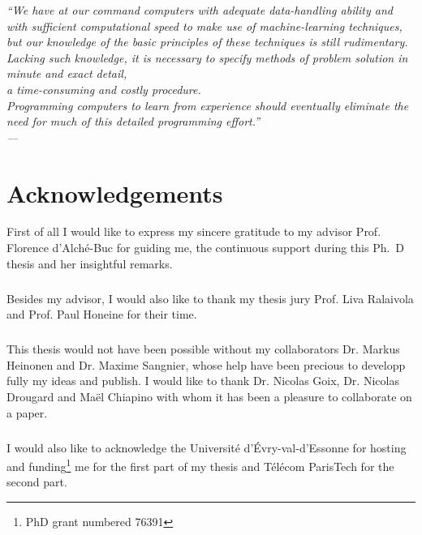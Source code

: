 

\begin{flushright}{\slshape
    ``We have at our command computers with adequate data-handling ability and
    with sufficient computational speed to make use of machine-learning
    techniques, \\
    but our knowledge of the basic principles of these techniques is still
    rudimentary. \\
    Lacking such knowledge, it is necessary to specify methods of
    problem solution in minute and exact detail, \\
    a time-consuming and costly procedure. \\
    Programming computers to learn from experience should eventually
    eliminate the need for much of this detailed programming effort.'' \\
    --- 
    \citep{samuel1959some}}
\end{flushright}

\bigskip


\begingroup

\let\clearpage\relax
\let\cleardoublepage\relax
\let\cleardoublepage\relax

\chapter*{Acknowledgements}

First of all I would like to express my sincere gratitude to my advisor Prof.
Florence d'Alch\'e-Buc for guiding me, the continuous support during this
Ph.~D thesis and her insightful remarks.
\paragraph{}
Besides my advisor, I would also like to thank my thesis jury Prof. Liva
Ralaivola and Prof. Paul Honeine for their time.
\paragraph{}
This thesis would not have been possible without my collaborators Dr. Markus
Heinonen and Dr. Maxime Sangnier, whose help have been precious to developp
fully my ideas and publish. I would like to thank Dr. Nicolas Goix, Dr. Nicolas
Drougard and Ma\"el Chiapino with whom it has been a pleasure to collaborate on
a paper.
\paragraph{}
I would also like to acknowledge the Universit\'e d'\'Evry-val-d'Essonne for
hosting and funding\footnote{PhD grant numbered 76391} me for the first part
of my thesis and T\'el\'ecom ParisTech for the second part.

\endgroup

\chapterend
